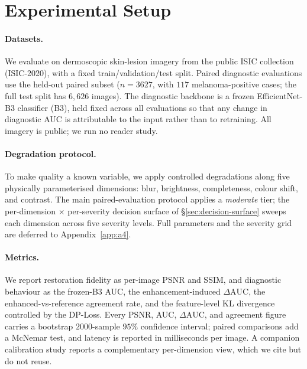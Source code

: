 
\section{Experimental Setup}
\label{sec:setup}

\paragraph{Datasets.}
We evaluate on dermoscopic skin-lesion imagery from the public ISIC collection
(ISIC-2020), with a fixed train/validation/test split. Paired diagnostic
evaluations use the held-out paired subset ($n=3627$, with $117$
melanoma-positive cases; the full test split has $6{,}626$ images). The
diagnostic backbone is a frozen EfficientNet-B3 classifier (B3), held fixed
across all evaluations so that any change in diagnostic AUC is attributable to
the input rather than to retraining. All imagery is public; we run no reader study.

\paragraph{Degradation protocol.}
To make quality a known variable, we apply controlled degradations along five
physically parameterised dimensions: blur, brightness, completeness, colour
shift, and contrast. The main paired-evaluation protocol applies a
\emph{moderate} tier; the per-dimension $\times$ per-severity decision surface of
\S\ref{sec:decision-surface} sweeps each dimension across five severity levels.
Full parameters and the severity grid are deferred to Appendix~\ref{app:a4}.

\paragraph{Metrics.}
We report restoration fidelity as per-image PSNR and SSIM, and diagnostic
behaviour as the frozen-B3 AUC, the enhancement-induced $\Delta\mathrm{AUC}$, the
enhanced-vs-reference agreement rate, and the feature-level KL divergence
controlled by the DP-Loss. Every PSNR, AUC, $\Delta\mathrm{AUC}$, and agreement
figure carries a bootstrap $2000$-sample $95\%$ confidence interval; paired
comparisons add a McNemar test, and latency is reported in milliseconds per
image. A companion calibration study reports a complementary per-dimension
view, which we cite \citep{ANON-BMVC} but do not reuse.

